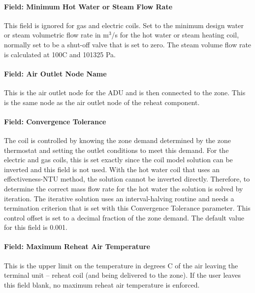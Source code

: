 \paragraph{Field: Minimum Hot Water or Steam Flow Rate}\label{field-minimum-hot-water-or-steam-flow-rate-3}

This field is ignored for gas and electric coils. Set to the minimum design water or steam volumetric flow rate in m\(^{3}\)/s for the hot water or steam heating coil, normally set to be a shut-off valve that is set to zero. The steam volume flow rate is calculated at 100C and 101325 Pa.

\paragraph{Field: Air Outlet Node Name}\label{field-air-outlet-node-name-3}

This is the air outlet node for the ADU and is then connected to the zone. This is the same node as the air outlet node of the reheat component.

\paragraph{Field: Convergence Tolerance}\label{field-convergence-tolerance-2}

The coil is controlled by knowing the zone demand determined by the zone thermostat and setting the outlet conditions to meet this demand. For the electric and gas coils, this is set exactly since the coil model solution can be inverted and this field is not used. With the hot water coil that uses an effectiveness-NTU method, the solution cannot be inverted directly. Therefore, to determine the correct mass flow rate for the hot water the solution is solved by iteration. The iterative solution uses an interval-halving routine and needs a termination criterion that is set with this Convergence Tolerance parameter. This control offset is set to a decimal fraction of the zone demand. The default value for this field is 0.001.

\paragraph{Field: Maximum Reheat Air Temperature}\label{field-maximum-reheat-air-temperature-2}

This is the upper limit on the temperature in degrees C of the air leaving the terminal unit -- reheat coil (and being delivered to the zone). If the user leaves this field blank, no maximum reheat air temperature is enforced.

